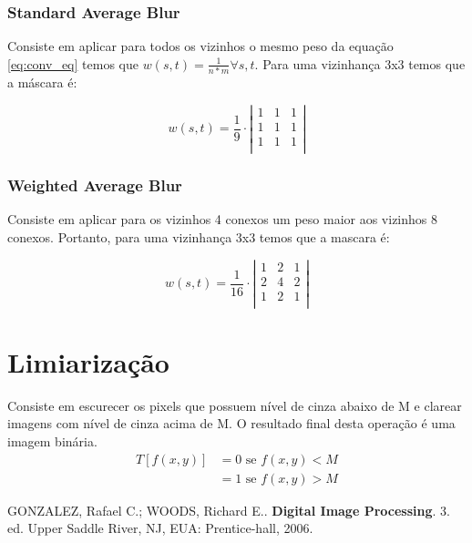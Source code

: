 \documentclass[10pt,a4paper]{article}
\begin{document}
\subsubsection*{Standard Average Blur}
Consiste em aplicar para todos os vizinhos o mesmo peso da equação \ref{eq:conv_eq} temos que $w(s,t) = \frac{1}{n * m} \forall s,t$. Para uma vizinhança 3x3 temos que a máscara é:

\[ w(s,t) = \frac{1}{9} \cdot \left|
\begin{array}{ccc}
1 & 1 & 1 \\
1 & 1 & 1 \\
1 & 1 & 1 \\
\end{array}\right|\]

\subsubsection*{Weighted Average Blur}
Consiste em aplicar para os vizinhos 4 conexos um peso maior aos vizinhos 8 conexos. Portanto, para uma vizinhança 3x3 temos que a mascara é:

\[ w(s,t) = \frac{1}{16} \cdot \left|
\begin{array}{ccc}
1 & 2 & 1 \\
2 & 4 & 2 \\
1 & 2 & 1 \\
\end{array}\right|\]

\section{Limiarização}
Consiste em escurecer os pixels que possuem nível de cinza abaixo de M e clarear imagens com nível de cinza acima de M. O resultado final desta operação é uma imagem binária.
\begin{align*}
    T[f(x,y)] &= 0 \text{ se } f(x,y) < M \\
              &= 1 \text{ se } f(x,y) > M
\end{align*}

\begin{thebibliography}{99}
     GONZALEZ, Rafael C.; WOODS, Richard E.. \textbf{Digital Image Processing}. 3. ed. Upper Saddle River, NJ, EUA: Prentice-hall, 2006.
\end{thebibliography}
\end{document}
